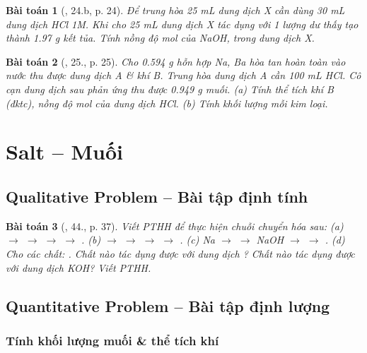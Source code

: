 \documentclass{article}
\newtheorem{baitoan}{Bài toán}
\begin{document}
\begin{baitoan}[\cite{An_350_BT_Hoa_Hoc_9}, 24.b, p. 24]
	Để trung hòa \emph{25 mL} dung dịch X cần dùng \emph{30 mL} dung dịch \emph{HCl 1M}. Khi cho \emph{25 mL} dung dịch X tác dụng với 1 lượng dư \emph{} thấy tạo thành \emph{1.97 g} kết tủa. Tính nồng độ mol của \emph{NaOH, } trong dung dịch X.
\end{baitoan}

\begin{baitoan}[\cite{An_350_BT_Hoa_Hoc_9}, 25., p. 25]
	Cho \emph{0.594 g} hỗn hợp \emph{Na, Ba} hòa tan hoàn toàn vào nước thu được dung dịch A \& khí B. Trung hòa dung dịch A cần \emph{100 mL HCl}. Cô cạn dung dịch sau phản ứng thu được \emph{0.949 g} muối. (a) Tính thể tích khí B (đktc), nồng độ mol của dung dịch \emph{HCl}. (b) Tính khối lượng mỗi kim loại.
\end{baitoan}


\section{Salt -- Muối}

\subsection{Qualitative Problem -- Bài tập định tính}

\begin{baitoan}[\cite{An_350_BT_Hoa_Hoc_9}, 44., p. 37]
	Viết PTHH để thực hiện chuỗi chuyển hóa sau: (a) \emph{ $\to$  $\to$  $\to$  $\to$ }. (b) \emph{ $\to$  $\to$  $\to$  $\to$ }. (c) \emph{Na $\to$  $\to$ NaOH $\to$  $\to$ }. (d) Cho các chất: \emph{}. Chất nào tác dụng được với dung dịch \emph{}? Chất nào tác dụng được với dung dịch \emph{KOH}? Viết PTHH.
\end{baitoan}

\subsection{Quantitative Problem -- Bài tập định lượng}

\subsubsection{Tính khối lượng muối \& thể tích khí }
\end{document}
